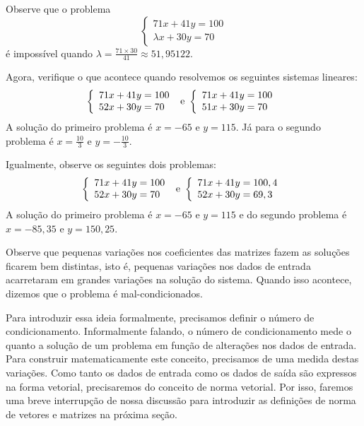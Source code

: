 \begin{ex} Observe que o problema
$$\left\{ \begin{array}{l}71x+41y=100\\
\lambda x+30y=70
\end{array}
\right.$$
é impossível quando $\lambda= \frac{71\times 30}{41}\approx 51,95122$.

Agora, verifique o que acontece quando resolvemos os seguintes sistemas lineares:
$$\left\{ \begin{array}{l}71x+41y=100\\
52x+30y=70
\end{array}
\right. \\ \hbox{ e }
\left\{ \begin{array}{l}71x+41y=100\\
51x+30y=70
\end{array}
\right. \\
$$
A solução do primeiro problema é $x=-65$ e $y=115$. Já para o segundo problema é $x=\frac{10}{3}$ e $y=-\frac{10}{3}$.

Igualmente, observe os seguintes dois problemas:
$$\left\{ \begin{array}{l}71x+41y=100\\
52x+30y=70
\end{array}
\right. \\ \hbox{ e }
\left\{ \begin{array}{l}71x+41y=100,4\\
52x+30y=69,3
\end{array}
\right. \\
$$
A solução do primeiro problema é $x=-65$ e $y=115$ e do segundo problema é $x=-85,35$ e $y=150,25$.

Observe que pequenas variações nos coeficientes das matrizes fazem as soluções ficarem bem distintas, isto é, pequenas variações nos dados de entrada acarretaram em grandes variações na solução do sistema. Quando isso acontece, dizemos que o problema é mal-condicionados.
\end{ex}

Para introduzir essa ideia formalmente, precisamos definir o número de condicionamento. Informalmente falando, o número de condicionamento mede o quanto a solução de um problema em função de alterações nos dados de entrada. Para construir matematicamente este conceito, precisamos de uma medida destas variações. Como tanto os dados de entrada como os dados de saída são expressos na forma vetorial, precisaremos do conceito de norma vetorial. Por isso, faremos uma breve interrupção de nossa discussão para introduzir as definições de norma de vetores e matrizes na próxima seção.

